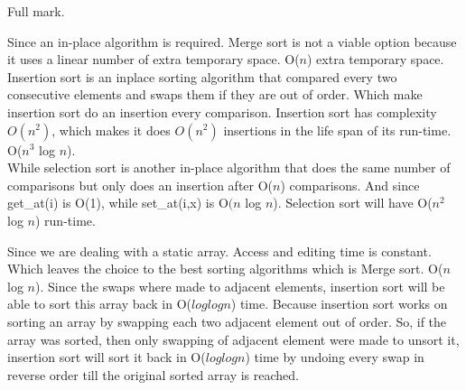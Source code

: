 \documentclass[12pt,twoside]{article}
\begin{document}


\begin{problems}

\problem  %

\begin{problemparts}
\problempart %
\problempart %
\problempart %
\problempart %
\end{problemparts}

\problem  %
Full mark.
\begin{problemparts}
\problempart %
Since an in-place algorithm is required. Merge sort is not a viable option because it uses a linear number of extra temporary space. O($n$) extra temporary space.
Insertion sort is an in\-place sorting algorithm that compared every two consecutive elements and swaps them if they are out of order. Which make insertion sort do an insertion every comparison. Insertion sort has complexity $O(n^2)$, which makes it does $O(n^2)$ insertions in the life span of its run-time. O($n^3$ log $n$).\\
While selection sort is another in-place algorithm that does the same number of comparisons but only does an insertion after O($n$) comparisons. And since get\_at(i) is O(1), while set\_at(i,x) is O$(n$ log $n$). Selection sort will have O($n^2$ log $n$) run-time.

 
\problempart %
Since we are dealing with a static array. Access and editing time is constant. Which leaves the choice to the best sorting algorithms which is Merge sort. O($n$ log $n$).
\problempart %
Since the swaps where made to adjacent elements, insertion sort will be able to sort this array back in O($loglogn$) time. Because insertion sort works on sorting an array by swapping each two adjacent element out of order. So, if the array was sorted, then only swapping of adjacent element were made to unsort it, insertion sort will sort it back in O($loglogn$) time by undoing every swap in reverse order till the original sorted array is reached.


\end{problemparts}
\end{problems}
\end{document}
